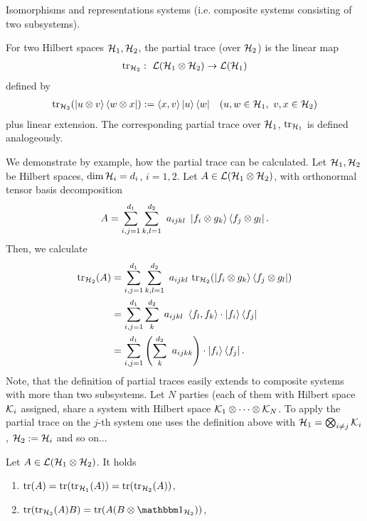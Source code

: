 \begin{subsection}{Isomorphisms and representations}
systems (i.e. composite systems consisting of two subsystems). 
\begin{definition}  
 For two Hilbert spaces ${\mathcal H}_1, {\mathcal H}_2$, the partial trace (over ${\mathcal H}_2$) is the linear map
 \begin{align*}
  \mathrm{tr}_{{\mathcal H}_2}: \ {\mathcal L}({\mathcal H}_1 \otimes {\mathcal H}_2) \rightarrow {\mathcal L}({\mathcal H}_1) 
 \end{align*} 
 defined by 
 \begin{align*}
  \mathrm{tr}_{{\mathcal H}_2}(\ket{u \otimes v}\bra{ w \otimes x}) := \braket{x,v} \ket{u}\bra{w} &&(u,w \in {\mathcal H}_1, \ v,x \in {\mathcal H}_2)
 \end{align*}
 plus linear extension. The corresponding partial trace over ${\mathcal H}_1$, $\mathrm{tr}_{{\mathcal H}_1}$ is defined analogeously. 
\end{definition}
 We demonstrate by example, how the partial trace can be calculated. Let ${\mathcal H}_1, {\mathcal H}_2$ be Hilbert spaces, $\dim {\mathcal H}_i = d_i$, $i = 1,2$.  
 Let $A \in {\mathcal L}({\mathcal H}_1 \otimes {\mathcal H}_2)$, with orthonormal tensor basis decomposition
 \begin{align*}
  A = \sum_{i,j=1}^{d_1} \sum_{k,l=1}^{d_2} \ a_{ijkl} \ \ket{f_i \otimes g_k} \bra{f_j \otimes g_l}. 
 \end{align*}
 Then, we calculate
 \begin{align*}
  \tr_{\cH_2}(A) 
  &= \sum_{i,j=1}^{d_1} \sum_{k,l=1}^{d_2} \ a_{ijkl} \ \tr_{\cH_2}(\ket{f_i \otimes g_k} \bra{f_j \otimes g_l}) \\
  &= \sum_{i,j=1}^{d_1} \sum_{k}^{d_2} \ a_{ijkl} \ \braket{f_l, f_k} \cdot \ket{f_i} \bra{f_j} \\
  &= \sum_{i,j=1}^{d_1}  \left(\sum_{k}^{d_2} \ a_{ijkk}\right)  \cdot \ket{f_i} \bra{f_j}.
 \end{align*}
  Note, that the definition of partial traces easily extends to composite systems with more than two subsystems. Let $N$ parties (each of them with Hilbert space 
  ${\mathcal K}_i$ assigned, share a system with Hilbert space ${\mathcal K}_1 \otimes \dots \otimes {\mathcal K}_N$. To apply the partial trace on the $j$-th system one uses the definition
  above with ${\mathcal H}_1 = \bigotimes_{i \neq j} {\mathcal K}_i$, ${\mathcal H}_2 := {\mathcal H}_i$ and so on...
  \begin{proposition}
  Let $A \in {\mathcal L}({\mathcal H}_1 \otimes {\mathcal H}_2)$. It holds 
  \begin{enumerate}
   \item $\mathrm{tr}(A) = \mathrm{tr}(\mathrm{tr}_{{\mathcal H}_1}(A)) = \mathrm{tr}(\mathrm{tr}_{{\mathcal H}_2}(A))$,
   \item $\tr(\tr_{\cH_2}(A)B) = \tr(A(B \otimes \bbmeins_{\cH_2}))$,

\end{enumerate}
\end{proposition}
\end{subsection}
